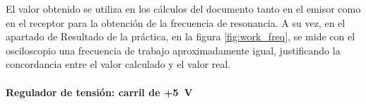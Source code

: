 El valor obtenido se utiliza en los c\'alculos del documento tanto en el emisor como en el receptor para la obtenci\'on de la frecuencia de resonancia. A su vez, en el apartado de Resultado de la pr\'actica, en la figura \ref{fig:work_freq}, se mide con el osciloscopio una frecuencia de trabajo aproximadamente igual, justificando la concordancia entre el valor calculado y el valor real.

\paragraph{}
\paragraph{Regulador de tensi\'on: carril de +\SI{5}{\volt}}
